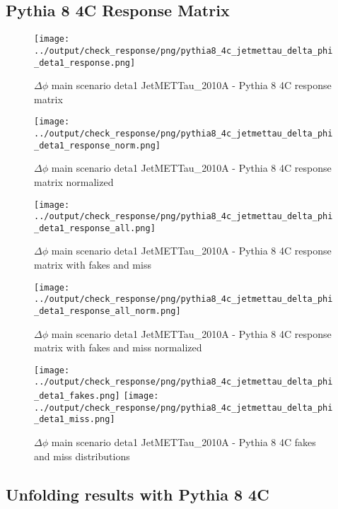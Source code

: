 \documentclass[11pt]{book}
\begin{document}
\subsection{Pythia 8 4C Response Matrix}


\begin{figure}[ht]
\centering
\texttt{[image: ../output/check\_response/png/pythia8\_4c\_jetmettau\_delta\_phi\_deta1\_response.png]}
\caption{$\Delta\phi$ main scenario deta1 JetMETTau\_2010A - Pythia 8 4C response matrix}
\label{p8_jetmettau_delta_phi_deta1_response}
\end{figure}

\begin{figure}[ht]
\centering
\texttt{[image: ../output/check\_response/png/pythia8\_4c\_jetmettau\_delta\_phi\_deta1\_response\_norm.png]}
\caption{$\Delta\phi$ main scenario deta1 JetMETTau\_2010A - Pythia 8 4C response matrix normalized}
\label{p8_jetmettau_delta_phi_deta1_response_norm}
\end{figure}

\begin{figure}[ht]
\centering
\texttt{[image: ../output/check\_response/png/pythia8\_4c\_jetmettau\_delta\_phi\_deta1\_response\_all.png]}
\caption{$\Delta\phi$ main scenario deta1 JetMETTau\_2010A - Pythia 8 4C response matrix with fakes and miss}
\label{p8_jetmettau_delta_phi_deta1_response_all}
\end{figure}

\begin{figure}[ht]
\centering
\texttt{[image: ../output/check\_response/png/pythia8\_4c\_jetmettau\_delta\_phi\_deta1\_response\_all\_norm.png]}
\caption{$\Delta\phi$ main scenario deta1 JetMETTau\_2010A - Pythia 8 4C response matrix with fakes and miss normalized}
\label{p8_jetmettau_delta_phi_deta1_response_all_norm}
\end{figure}

\begin{figure}[ht]
\centering
\texttt{[image: ../output/check\_response/png/pythia8\_4c\_jetmettau\_delta\_phi\_deta1\_fakes.png]}
\texttt{[image: ../output/check\_response/png/pythia8\_4c\_jetmettau\_delta\_phi\_deta1\_miss.png]}
\caption{$\Delta\phi$ main scenario deta1 JetMETTau\_2010A - Pythia 8 4C fakes and miss distributions}
\label{p8_jetmettau_delta_phi_deta1_fakesmiss}
\end{figure}


\clearpage
\subsection{Unfolding results with Pythia 8 4C}
\end{document}
